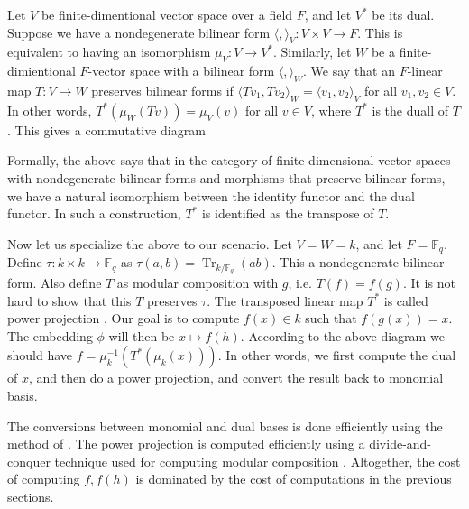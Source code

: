 \documentclass[12pt]{article}
\theoremstyle{plain}
\theoremstyle{definition}
\newcommand{\ang}[1]{\langle#1\rangle}
\DeclareMathOperator{\trace}{Tr} %
\def\F{\ensuremath{\mathbb{F}}}
\begin{document}
Let $V$ be finite-dimentional vector space over a field $F$, and let $V^*$ be its dual. Suppose we have a nondegenerate bilinear form $\ang{,}_V: V \times V \rightarrow F$. This is equivalent to having an isomorphism $\mu_V: V \rightarrow V^*$. Similarly, let $W$ be a finite-dimientional $F$-vector space with a bilinear form $\ang{,}_W$. We say that an $F$-linear map $T: V \rightarrow W$ preserves bilinear forms if $\ang{Tv_1, Tv_2}_W = \ang{v_1, v_2}_V$ for all $v_1, v_2 \in V$. In other words, $T^*(\mu_W(Tv)) = \mu_V(v)$ for all $v \in V$, where $T^*$ is the duall of $T$. This gives a commutative diagram
\begin{center}
\end{center}
Formally, the above says that in the category of finite-dimensional vector spaces with nondegenerate bilinear forms and morphisms that preserve bilinear forms, we have a natural isomorphism between the identity functor and the dual functor. In such a construction, $T^*$ is identified as the transpose of $T$.

Now let us specialize the above to our scenario. Let $V = W = k$, and let $F = \F_q$. Define $\tau: k \times k \rightarrow \F_q$ as $\tau(a, b) = \trace_{k / \F_q}(ab)$. This a nondegenerate bilinear form. Also define $T$ as modular composition with $g$, i.e. $T(f) = f(g)$. It is not hard to show that this $T$ preserves $\tau$. The transposed linear map $T^*$ is called power projection \cite{shoup95}. Our goal is to compute $f(x) \in k$ such that $f(g(x)) = x$. The embedding $\phi$ will then be $x \mapsto f(h)$. According to the above diagram we should have $f = \mu_k^{-1}(T^*(\mu_k(x)))$. In other words, we first compute the dual of $x$, and then do a power projection, and convert the result back to monomial basis.

The conversions between monomial and dual bases is done efficiently using the method of \cite{DeDoSc2014}. The power projection is computed efficiently using a divide-and-conquer technique used for computing modular composition \cite{shoup95}. Altogether, the cost of computing $f, f(h)$ is dominated by the cost of computations in the previous sections.
\end{document}
